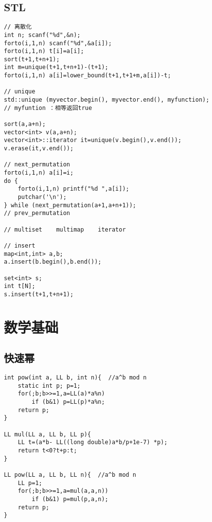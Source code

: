 \documentclass{article}
\begin{document}
\subsection{STL}
\begin{lstlisting}
// 离散化
int n; scanf("%d",&n);
forto(i,1,n) scanf("%d",&a[i]);
forto(i,1,n) t[i]=a[i];
sort(t+1,t+n+1);
int m=unique(t+1,t+n+1)-(t+1);
forto(i,1,n) a[i]=lower_bound(t+1,t+1+m,a[i])-t;

// unique
std::unique (myvector.begin(), myvector.end(), myfunction);
// myfuntion ：相等返回true

sort(a,a+n);
vector<int> v(a,a+n);
vector<int>::iterator it=unique(v.begin(),v.end());
v.erase(it,v.end());

// next_permutation
forto(i,1,n) a[i]=i;
do {
	forto(i,1,n) printf("%d ",a[i]);
	putchar('\n');
} while (next_permutation(a+1,a+n+1));
// prev_permutation

// multiset    multimap    iterator

// insert
map<int,int> a,b;
a.insert(b.begin(),b.end());

set<int> s;
int t[N];
s.insert(t+1,t+n+1);
\end{lstlisting}


\section{数学基础}

\subsection{快速幂}
\begin{lstlisting}
int pow(int a, LL b, int n){  //a^b mod n
	static int p; p=1;
	for(;b;b>>=1,a=LL(a)*a%n)
		if (b&1) p=LL(p)*a%n;
    return p;
}

LL mul(LL a, LL b, LL p){
    LL t=(a*b- LL((long double)a*b/p+1e-7) *p);
    return t<0?t+p:t;
}

LL pow(LL a, LL b, LL n){  //a^b mod n
    LL p=1;
    for(;b;b>>=1,a=mul(a,a,n))
		if (b&1) p=mul(p,a,n);
    return p;
}
\end{lstlisting}
\end{document}
